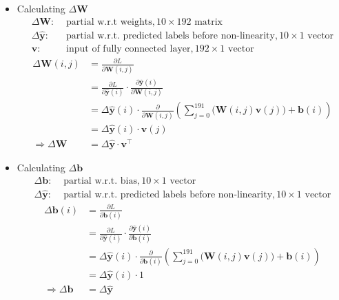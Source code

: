 \documentclass[12pt]{article}
\renewcommand{\vec}[1]{\mathbf{#1}}
\begin{document}
\begin{itemize}
\item Calculating $\Delta \bm{W}$
\begin{align*}
    \Delta \bm{W}:& \text{ partial w.r.t weights}, 10 \times 192 \text{ matrix}\\
    \Delta{\vec{\hat{y}}}:& \text{ partial w.r.t. predicted labels before non-linearity}, 10 \times 1 \text{ vector}\\
    \vec{v}:& \text{ input of fully connected layer}, 192 \times 1 \text{ vector}
\end{align*}
\begin{align*}
    \Delta \bm{W}(i, j)
    &= \frac{\partial{L}}{\partial{\bm{W}(i, j)}}\\
    &= \frac{\partial{L}}{\partial{\vec{\hat{y}}(i)}}
    \cdot
    \frac{\partial{\vec{\hat{y}}(i)}}{\partial{\bm{W}(i, j)}}\\
    &= \Delta{\vec{\hat{y}}}(i)
    \cdot
    \frac{\partial}{\partial{\bm{W}(i, j)}}\left(\sum_{j = 0}^{191}\Big(\bm{W}(i, j)\vec{v}(j)\Big) + \vec{b}(i)\right)\\
    &= \Delta{\vec{\hat{y}}}(i) \cdot \vec{v}(j)\\
    \Rightarrow \Delta \bm{W} &= \Delta{\vec{\hat{y}}} \cdot \vec{v}^\top
\end{align*}

\item Calculating $\Delta \vec{b}$
\begin{align*}
    \Delta \vec{b}:& \text{ partial w.r.t. bias}, 10 \times 1 \text{ vector}\\
    \Delta{\vec{\hat{y}}}:& \text{ partial w.r.t. predicted labels before non-linearity}, 10 \times 1 \text{ vector}
\end{align*}
\begin{align*}
    \Delta \vec{b}(i)
    &= \frac{\partial{L}}{\partial{\vec{b}(i)}}\\
    &= \frac{\partial{L}}{\partial{\vec{\hat{y}}(i)}}
    \cdot
    \frac{\partial{\vec{\hat{y}}(i)}}{\partial{\vec{b}(i)}}\\
    &= \Delta{\vec{\hat{y}}}(i)
    \cdot
    \frac{\partial}{\partial{\vec{b}(i)}}\left(\sum_{j = 0}^{191}\Big(\bm{W}(i, j)\vec{v}(j)\Big) + \vec{b}(i)\right)\\
    &= \Delta{\vec{\hat{y}}}(i) \cdot 1\\
    \Rightarrow \Delta \vec{b} &= \Delta{\vec{\hat{y}}}
\end{align*}

\end{itemize}
\end{document}
